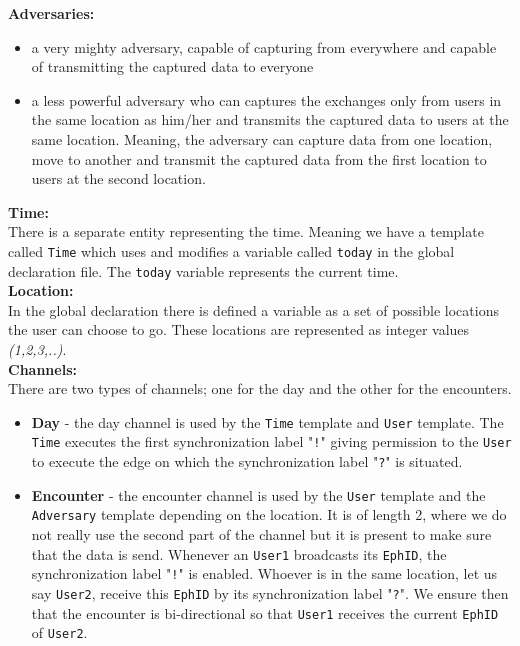 \documentclass[a4paper, twocolumn]{article}
\begin{document}
\noindent \textbf{Adversaries:}
\begin{itemize}
    \item a very mighty adversary, capable of capturing from everywhere and capable of transmitting the captured data to everyone
    \item a less powerful adversary who can captures the exchanges only from users in the same location as him/her and transmits the captured data to users at the same location. Meaning, the adversary can capture data from one location, move to another and transmit the captured data from the first location to users at the second location.
\end{itemize}

\noindent \textbf{Time:}\\
There is a separate entity representing the time. Meaning we have a template called \texttt{Time} which uses and modifies a variable called \texttt{today} in the global declaration file. The \texttt{today} variable represents the current time.\\

\noindent \textbf{Location:}\\
In the global declaration there is defined a variable as a set of possible locations the user can choose to go. These locations are represented as integer values \textit{(1,2,3,..)}.\\

\noindent \textbf{Channels:}\\
There are two types of channels; one for the day and the other for the encounters.
\begin{itemize}
    \item \textbf{Day} - the day channel is used by the \texttt{Time} template and \texttt{User} template. The \texttt{Time} executes the first synchronization label "\texttt{!}" giving permission to the \texttt{User} to execute the edge on which the synchronization label "\texttt{?}" is situated.
    \item \textbf{Encounter} - the encounter channel is used by the \texttt{User} template and the \texttt{Adversary} template depending on the location. It is of length 2, where we do not really use the second part of the channel but it is present to make sure that the data is send. Whenever an \texttt{User1} broadcasts its \texttt{EphID}, the synchronization label "\texttt{!}" is enabled. Whoever is in the same location, let us say \texttt{User2}, receive this \texttt{EphID} by its synchronization label "\texttt{?}". We ensure then that the encounter is bi-directional so that \texttt{User1} receives the current \texttt{EphID} of \texttt{User2}.
\end{itemize}
\end{document}
